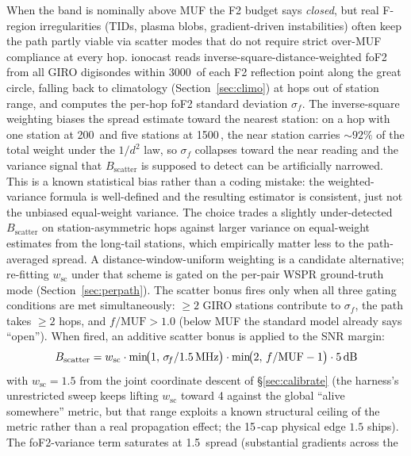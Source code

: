 \documentclass[11pt,a4paper]{article}
\newcommand{\SI}[2]{#1\,\text{#2}}
\newcommand{\dB}{\text{dB}}
\newcommand{\MHz}{\text{MHz}}
\newcommand{\km}{\text{km}}
\begin{document}
When the band is nominally above MUF the F2 budget says
\emph{closed}, but real F-region irregularities (TIDs, plasma blobs,
gradient-driven instabilities) often keep the path partly viable via
scatter modes that do not require strict over-MUF compliance at
every hop.  ionocast reads inverse-square-distance-weighted foF2 from
all GIRO digisondes within \SI{3000}{\km} of each F2 reflection point
along the great circle, falling back to climatology
(Section~\ref{sec:climo}) at hops out of station range, and computes
the per-hop foF2 standard deviation $\sigma_{\!f}$.  The
inverse-square weighting biases the spread estimate toward the
nearest station: on a hop with one station at \SI{200}{\km} and
five stations at \SI{1500}{\km}, the near station carries
${\sim}92\%$ of the total weight under the $1/d^2$ law, so $\sigma_{\!f}$ collapses
toward the near reading and the variance signal that
$B_{\text{scatter}}$ is supposed to detect can be artificially
narrowed.  This is a known statistical bias rather than a coding
mistake: the weighted-variance formula is well-defined and the
resulting estimator is consistent, just not the unbiased
equal-weight variance.  The choice trades a slightly under-detected
$B_{\text{scatter}}$ on station-asymmetric hops against larger
variance on equal-weight estimates from the long-tail stations,
which empirically matter less to the path-averaged spread.  A
distance-window-uniform weighting is a candidate alternative;
re-fitting $w_{\text{sc}}$ under that scheme is gated on the
per-pair WSPR ground-truth mode (Section~\ref{sec:perpath}).
The scatter bonus fires only when all three gating conditions are
met simultaneously: $\geq 2$ GIRO stations contribute to
$\sigma_{\!f}$, the path takes $\geq 2$ hops, and
$f / \text{MUF} > 1.0$ (below MUF the standard model already says
``open'').  When fired, an additive scatter bonus is applied to
the SNR margin:
\begin{equation}\label{eq:scatterbonus}
  B_{\text{scatter}} =
    w_{\text{sc}}\cdot
    \min\!\bigl(1,\,\sigma_{\!f}/\SI{1.5}{\MHz}\bigr)\cdot
    \min\!\bigl(2,\,f/\text{MUF} - 1\bigr)\cdot
    \SI{5}{\dB}
\end{equation}
with $w_{\text{sc}} = 1.5$ from the joint
coordinate descent of \S\ref{sec:calibrate} (the harness's
unrestricted sweep keeps lifting $w_{\text{sc}}$ toward 4 against
the global ``alive somewhere'' metric, but that range exploits a
known structural ceiling of the metric rather than a real
propagation effect; the \SI{15}{\dB}-cap physical edge $1.5$
ships).  The foF2-variance term
saturates at \SI{1.5}{\MHz} spread (substantial gradients across the
\end{document}
